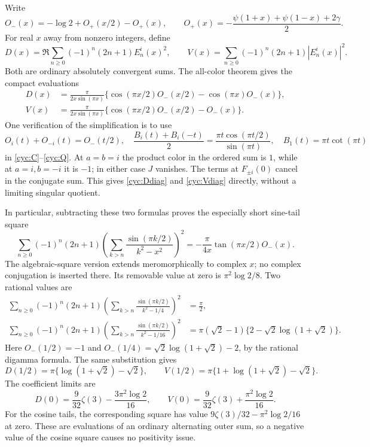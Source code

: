 \documentclass[11pt,a4paper]{article}
\numberwithin{equation}{section}
\theoremstyle{definition}
\theoremstyle{remark}
\begin{document}
Write
\[
 O_-(x)=-\log2+O_+(x/2)-O_+(x),\qquad
 O_+(x)=-\frac{\psi(1+x)+\psi(1-x)+2\gamma}{2}.
\]
For real $x$ away from nonzero integers, define
\[
 D(x)=\Re\sum_{n\ge0}(-1)^n(2n+1)E_n^i(x)^2,\qquad
 V(x)=\sum_{n\ge0}(-1)^n(2n+1)|E_n^i(x)|^2.
\]
Both are ordinary absolutely convergent sums.  The all-color theorem
gives the compact evaluations
\begin{align}
 D(x)&=\frac{\pi}{2x\sin(\pi x)}
   \{\cos(\pi x/2)O_-(x/2)-\cos(\pi x)O_-(x)\},
 \label{cyc:Ddiag}\\
 V(x)&=\frac{\pi}{2x\sin(\pi x)}
   \{\cos(\pi x/2)O_-(x/2)-O_-(x)\}.
 \label{cyc:Vdiag}
\end{align}
One verification of the simplification is to use
\[
 O_i(t)+O_{-i}(t)=O_-(t/2),\quad
 \frac{B_i(t)+B_i(-t)}2
       =\frac{\pi t\cos(\pi t/2)}{\sin(\pi t)},
 \quad B_1(t)=\pi t\cot(\pi t)
\]
in \eqref{cyc:C}--\eqref{cyc:Q}.  At $a=b=i$ the product color in
the ordered sum is $1$, while at $a=i,b=-i$ it is $-1$;
in either case $J$ vanishes.  The terms at $F_{\pm i}(0)$ cancel
in the conjugate sum.  This gives \eqref{cyc:Ddiag} and
\eqref{cyc:Vdiag} directly, without a limiting singular quotient.

In particular, subtracting these two formulas proves the especially
short sine-tail square
\begin{equation}\label{cyc:sinesquare}
 \boxed{\displaystyle
 \sum_{n\ge0}(-1)^n(2n+1)
  \left(\sum_{k>n}\frac{\sin(\pi k/2)}{k^2-x^2}\right)^2
       =-\frac{\pi}{4x}\tan(\pi x/2)O_-(x).}
\end{equation}
The algebraic-square version extends meromorphically to complex $x$;
no complex conjugation is inserted there.  Its removable value at
zero is $\pi^2\log2/8$.  Two rational values are
\begin{align}
 \sum_{n\ge0}(-1)^n(2n+1)
  \left(\sum_{k>n}\frac{\sin(\pi k/2)}{k^2-1/4}\right)^2
       &=\frac\pi2,\label{cyc:sinehalf}\\
 \sum_{n\ge0}(-1)^n(2n+1)
  \left(\sum_{k>n}\frac{\sin(\pi k/2)}{k^2-1/16}\right)^2
       &=\pi(\sqrt2-1)
                 \{2-\sqrt2\log(1+\sqrt2)\}.
 \label{cyc:sinequarter}
\end{align}
Here $O_-(1/2)=-1$ and
$O_-(1/4)=\sqrt2\log(1+\sqrt2)-2$, by the rational digamma
formula.  The same substitution gives
\[
 D(1/2)=\pi\{\log(1+\sqrt2)-\sqrt2\},\qquad
 V(1/2)=\pi\{1+\log(1+\sqrt2)-\sqrt2\}.
\]
The coefficient limits are
\[
 D(0)=\frac9{32}\zeta(3)-\frac{3\pi^2\log2}{16},\qquad
 V(0)=\frac9{32}\zeta(3)+\frac{\pi^2\log2}{16}.
\]
For the cosine tails, the corresponding square has value
$9\zeta(3)/32-\pi^2\log2/16$ at zero.  These are evaluations
of an ordinary alternating outer sum, so a negative value of the
cosine square causes no positivity issue.
\end{document}
